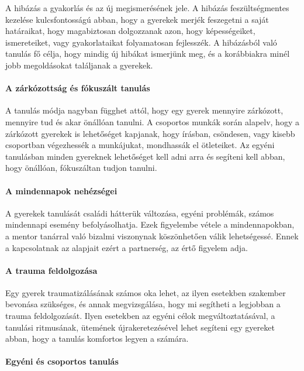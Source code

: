 A hibázás a gyakorlás és az új megismerésének jele. A hibázás
feszültségmentes kezelése kulcsfontosságú abban, hogy a gyerekek merjék
feszegetni a saját határaikat, hogy magabiztosan dolgozzanak azon, hogy
képességeiket, ismereteiket, vagy gyakorlataikat folyamatosan
fejlesszék. A hibázásból való tanulás fő célja, hogy mindig új hibákat
ismerjünk meg, és a korábbiakra minél jobb megoldásokat találjanak a
gyerekek.

\paragraph{A zárkózottság és fókuszált
tanulás}

A tanulás módja nagyban függhet attól, hogy egy gyerek mennyire
zárkózott, mennyire tud és akar önállóan tanulni. A csoportos munkák
során alapelv, hogy a zárkózott gyerekek is lehetőséget kapjanak, hogy
írásban, csöndesen, vagy kisebb csoportban végezhessék a munkájukat,
mondhassák el ötleteiket. Az egyéni tanulásban minden gyereknek
lehetőséget kell adni arra és segíteni kell abban, hogy önállóan,
fókuszáltan tudjon tanulni.

\paragraph{A mindennapok
nehézségei}

A gyerekek tanulását családi hátterük változása, egyéni problémák,
számos mindennapi esemény befolyásolhatja. Ezek figyelembe vétele a
mindennapokban, a mentor tanárral való bizalmi viszonynak köszönhetően
válik lehetségessé. Ennek a kapcsolatnak az alapjait ezért a partnerség,
az értő figyelem adja.

\paragraph{A trauma feldolgozása}

Egy gyerek traumatizálásának számos oka lehet, az ilyen esetekben
szakember bevonása szükséges, és annak megvizsgálása, hogy mi segítheti
a legjobban a trauma feldolgozását. Ilyen esetekben az egyéni célok
megváltoztatásával, a tanulási ritmusának, ütemének újrakeretezésével
lehet segíteni egy gyereket abban, hogy a tanulás komfortos legyen a
számára.

\paragraph{Egyéni és csoportos
tanulás}

